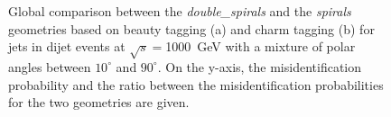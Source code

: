 \begin{figure}[H]
\begin{subfigure}[b]{0.5\textwidth}
    \caption{}
    \label{}
  \end{subfigure}
  \caption{Global comparison between the \textit{double\_spirals} and the
    \textit{spirals} geometries based on beauty tagging (a) and charm
    tagging (b) for jets in dijet events at $\sqrt{s}=$1000~GeV with a
    mixture of polar angles between $10^{\circ}$ and $90^{\circ}$. On the y-axis, the misidentification probability and the ratio between the misidentification probabilities for the two geometries are given.}\label{fig:globalComparison_double_spirals_1000}
\end{figure}

